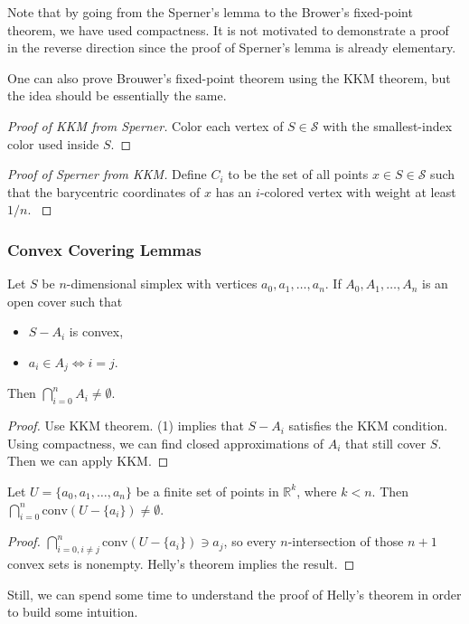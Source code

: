Note that by going from the Sperner's lemma to the Brower's fixed-point theorem, we have used compactness. It is not motivated to demonstrate a proof in the reverse direction since the proof of Sperner's lemma is already elementary.

One can also prove Brouwer's fixed-point theorem using the KKM theorem, but the idea should be essentially the same.

\begin{proof}[Proof of KKM from Sperner]
    Color each vertex of $S \in \mathcal{S}$ with the smallest-index color used inside $S$.
\end{proof}
\begin{proof}[Proof of Sperner from KKM]
    Define $C_i$ to be the set of all points $x \in S \in \mathcal{S}$ such that the barycentric coordinates of $x$ has an $i$-colored vertex with weight at least $1/n$. \autocite{voorneveldKKMSperner2017}
\end{proof}

\subsubsection{Convex Covering Lemmas}

\begin{thm}
    Let $S$ be $n$-dimensional simplex with vertices $a_0, a_1, \ldots, a_n$. If $A_0, A_1, \ldots, A_n$ is an open cover such that
    \begin{itemize}
        \item $S - A_i$ is convex,
        \item $a_i \in A_j \iff i = j$.
    \end{itemize}
    Then $\bigcap_{i=0}^n A_i \neq \emptyset$.
\end{thm}
\begin{proof}
    Use KKM theorem. (1) implies that $S - A_i$ satisfies the KKM condition. Using compactness, we can find closed approximations of $A_i$ that still cover $S$. Then we can apply KKM.
\end{proof}

\begin{thm}
    Let $U = \{ a_0, a_1, \ldots, a_n \}$ be a finite set of points in $\mathbb{R}^k$, where $k < n$. Then $\bigcap_{i=0}^n \text{conv}(U - \{a_i\}) \neq \emptyset$.
\end{thm}
\begin{proof}
    $\bigcap_{i=0, i \neq j}^n \text{conv}(U - \{a_i\}) \ni a_j$, so every $n$-intersection of those $n+1$ convex sets is nonempty. Helly's theorem implies the result.
\end{proof}
Still, we can spend some time to understand the proof of Helly's theorem in order to build some intuition. \followup

